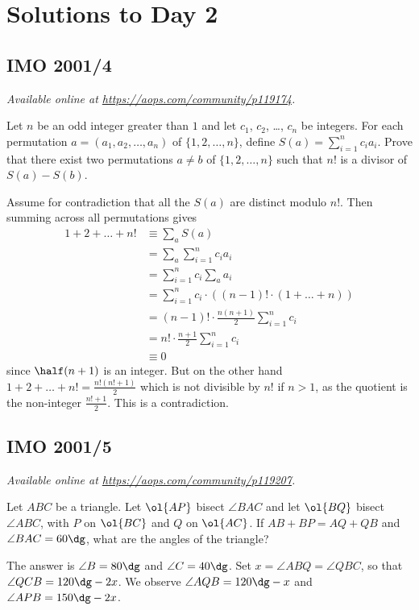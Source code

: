 \documentclass[11pt]{scrartcl}
\begin{document}
\section{Solutions to Day 2}
\subsection{IMO 2001/4}
\textsl{Available online at \url{https://aops.com/community/p119174}.}
\begin{mdframed}[style=mdpurplebox,frametitle={Problem statement}]
Let $n$ be an odd integer greater than $1$
and let $c_1$, $c_2$, \dots, $c_n$ be integers.
For each permutation $a = (a_1, a_2, \dots, a_n)$
of $\{1,2,\dots,n\}$, define $S(a) = \sum_{i=1}^n c_i a_i$.
Prove that there exist two permutations $a \neq b$
of $\{1,2,\dots,n\}$ such that $n!$
is a divisor of $S(a)-S(b)$.
\end{mdframed}
Assume for contradiction that all the $S(a)$ are distinct modulo $n!$.
Then summing across all permutations gives
\begin{align*}
  1 + 2 + \dots + n!
  &\equiv \sum_a S(a) \\
  &= \sum_a \sum_{i=1}^n c_i a_i \\
  &= \sum_{i=1}^n c_i \sum_a a_i \\
  &= \sum_{i=1}^n c_i \cdot \left( (n-1)! \cdot (1+\dots+n) \right) \\
  &= (n-1)! \cdot \frac{n(n+1)}{2} \sum_{i=1}^n c_i \\
  &= n! \cdot \frac{n+1}{2} \sum_{i=1}^n c_i \\
  &\equiv 0
\end{align*}
since $\half(n+1)$ is an integer.
But on the other hand
$1 + 2 + \dots + n! = \frac{n!(n!+1)}{2}$
which is not divisible by $n!$ if $n > 1$,
as the quotient is the non-integer $\frac{n!+1}{2}$.
This is a contradiction.
\pagebreak

\subsection{IMO 2001/5}
\textsl{Available online at \url{https://aops.com/community/p119207}.}
\begin{mdframed}[style=mdpurplebox,frametitle={Problem statement}]
Let $ABC$ be a triangle.
Let $\ol{AP}$ bisect $\angle BAC$ and let $\ol{BQ}$ bisect $\angle ABC$,
with $P$ on $\ol{BC}$ and $Q$ on $\ol{AC}$.
If $AB + BP = AQ + QB$ and $\angle BAC = 60\dg$,
what are the angles of the triangle?
\end{mdframed}
The answer is $\angle B = 80\dg$ and $\angle C = 40\dg$.
Set $x = \angle ABQ = \angle QBC$, so that $\angle QCB = 120\dg - 2x$.
We observe $\angle AQB = 120\dg - x$ and $\angle APB = 150\dg - 2x$.
\end{document}

